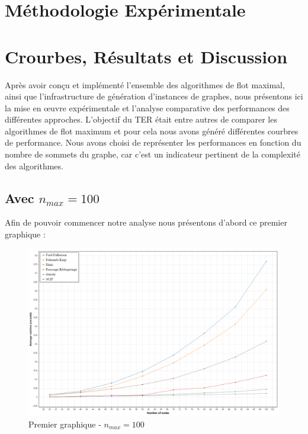 \documentclass[a4paper]{article}
\begin{document}
\section{Méthodologie Expérimentale}


\section{Crourbes, Résultats et Discussion}

Après avoir conçu et implémenté l’ensemble des algorithmes de flot maximal, ainsi que l’infrastructure de génération d’instances de graphes, nous présentons ici la mise en œuvre expérimentale et l’analyse comparative des performances des différentes approches. L'objectif du TER était entre autres de comparer les algorithmes de flot maximum et pour cela nous avons généré différentes courbres de performance. Nous avons choisi de représenter les performances en fonction du nombre de sommets du graphe, car c'est un indicateur pertinent de la complexité des algorithmes.\\

\subsection{Avec $n_{max} = 100$}

Afin de pouvoir commencer notre analyse nous présentons d'abord ce premier graphique :

\begin{figure}[h]
    \centering
    \includegraphics[width=1\textwidth]{courbes/benchmark_global_average_100.png}
    \caption{Premier graphique - $n_{max} = 100$}
    \label{fig:example}
\end{figure}
\end{document}
